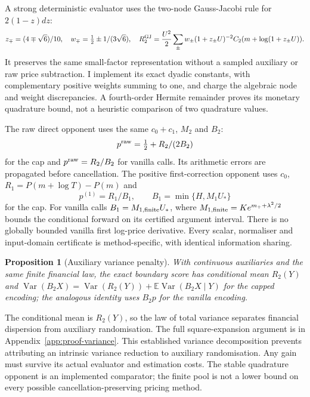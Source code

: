 \documentclass[11pt]{article}
\newtheorem{proposition}[theorem]{Proposition}
\newcommand{\E}{\mathbb E}
\DeclareMathOperator{\Var}{Var}
\begin{document}
A strong deterministic evaluator uses the two-node Gauss-Jacobi rule for
$2(1-z)dz$:
\begin{equation}
 z_\mp=(4\mp\sqrt6)/10,\quad
 w_\mp=\tfrac12\pm1/(3\sqrt6),\quad
 R_2^{\rm GJ}=\frac{U^2}{2}\sum_\pm
 w_\pm(1+z_\pm U)^{-2}C_2(m+\log(1+z_\pm U)).
 \label{eq:stable-kernel}
\end{equation}
It preserves the same small-factor representation without a sampled
auxiliary or raw price subtraction. I implement its exact dyadic constants,
with complementary positive weights summing to one, and charge the
algebraic node and weight discrepancies. A fourth-order Hermite remainder
proves its monetary quadrature bound, not a heuristic comparison of two
quadrature values.

The raw direct opponent uses the same $c_0+c_1$, $M_2$ and $B_2$:
\begin{equation}
 p^{\rm raw}=\tfrac12+R_2/(2B_2)
 \label{eq:direct-probability}
\end{equation}
for the cap and $p^{\rm raw}=R_2/B_2$ for vanilla calls. Its arithmetic
errors are propagated before cancellation. The positive first-correction
opponent uses $c_0$, $R_1=P(m+\log T)-P(m)$ and
\begin{equation}
 p^{(1)}=R_1/B_1,\qquad B_1=\min\{H,M_1U_*\}
 \label{eq:first-probability}
\end{equation}
for the cap. For vanilla calls $B_1=M_{1,\rm finite}U_*$, where
$M_{1,\rm finite}=Ke^{m_++\lambda^2/2}$ bounds the conditional forward on
its certified argument interval. There is no globally bounded vanilla
first log-price derivative. Every scalar, normaliser and input-domain
certificate is method-specific, with identical information sharing.

\begin{proposition}[Auxiliary variance penalty]
\label{prop:variance}
With continuous auxiliaries and the same finite financial law, the exact
boundary score has conditional mean $R_2(Y)$ and
$\Var(B_2X)=\Var(R_2(Y))+\E\Var(B_2X\mid Y)$ for the capped encoding;
the analogous identity uses $B_2p$ for the vanilla encoding.
\end{proposition}
The conditional mean is $R_2(Y)$, so the law of total variance separates financial dispersion from auxiliary randomisation. The full square-expansion argument is in Appendix~\ref{app:proof-variance}.
This established variance decomposition prevents attributing an intrinsic
variance reduction to auxiliary randomisation. Any gain must survive its
actual evaluator and estimation costs. The stable quadrature opponent is
an implemented comparator; the finite pool is not a lower bound on every
possible cancellation-preserving pricing method.
\end{document}
